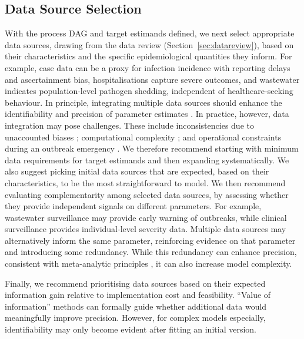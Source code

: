 \documentclass{article}
\begin{document}
\subsection{Data Source Selection} \label{sec:data-selection}

With the process \ac{DAG} and target estimands defined, we next select appropriate data sources, drawing from the data review (Section~\ref{sec:datareview}), based on their characteristics and the specific epidemiological quantities they inform.
For example, case data can be a proxy for infection incidence with reporting delays and ascertainment bias, hospitalisations capture severe outcomes, and wastewater indicates population-level pathogen shedding, independent of healthcare-seeking behaviour.
In principle, integrating multiple data sources should enhance the identifiability and precision of parameter estimates \citep{deangelis2018analysing, lison2024generative, russell2024combined, birrell2025real}. In practice, however, data integration may pose challenges. 
These include inconsistencies due to unaccounted biases \citep{presanis2013conflict,knock2021key, Ward2024-sp, corbella2022inferring}; computational complexity \citep{corbella2022inferring}; and operational constraints during an outbreak emergency \citep{mccaw2023role}.
We therefore recommend starting with minimum data requirements for target estimands and then expanding systematically. 
We also suggest picking initial data sources that are expected, based on their characteristics, to be the most straightforward to model.
We then recommend evaluating complementarity among selected data sources, by assessing whether they provide independent signals on different parameters. For example, wastewater surveillance may provide early warning of outbreaks, while clinical surveillance provides individual-level severity data. Multiple data sources may alternatively inform the same parameter, reinforcing evidence on that parameter and introducing some redundancy. While this redundancy can enhance precision, consistent with meta-analytic principles \citep{deangelis2018analysing,borenstein2021introduction}, it can also increase model complexity.

Finally, we recommend prioritising data sources based on their expected information gain relative to implementation cost and feasibility. ``Value of information'' methods \citep{jackson2019value,heath2024value} can formally guide whether additional data would meaningfully improve precision. However, for complex models especially, identifiability may only become evident after fitting an initial version.
\end{document}
